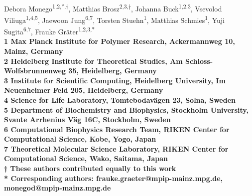 \documentclass[10pt,letterpaper]{article}
\begin{document}
\vspace*{0.35in}

\begin{flushleft}
{\Large
\textbf{}
}
\newline
\\
Debora Monego\textsuperscript{1,2,*,†},
Matthias Brosz\textsuperscript{2,3,†},
Johanna Buck\textsuperscript{1,2,3},
Vsevolod Viliuga\textsuperscript{1,4,5},
Jaewoon Jung\textsuperscript{6,7},
Torsten Stuehn\textsuperscript{1},
Matthias Schmies\textsuperscript{1},
Yuji Sugita\textsuperscript{6,7},
Frauke Gr\"ater\textsuperscript{1,2,3,*}
\\
\bigskip
\bf{1} Max Planck Institute for Polymer Research, Ackermannweg 10, Mainz, Germany
\\
\bf{2} Heidelberg Institute for Theoretical Studies, Am Schloss-Wolfsbrunnenweg 35, Heidelberg, Germany
\\
\bf{3} Institute for Scientific Computing, Heidelberg University, Im Neuenheimer Feld 205, Heidelberg, Germany
\\
\bf{4} Science for Life Laboratory, Tomtebodavägen 23, Solna, Sweden
\\
\bf{5} Department of Biochemistry and Biophysics, Stockholm University, Svante Arrhenius Väg 16C, Stockholm, Sweden
\\
\bf{6} Computational Biophysics Research Team, RIKEN Center for Computational Science, Kobe, Yogo, Japan
\\
\bf{7} Theoretical Molecular Science Laboratory, RIKEN Center for Computational Science, Wako, Saitama, Japan
\\
\bigskip
† These authors contributed equally to this work
\\
* Corresponding authors: frauke.graeter@mpip-mainz.mpg.de, monegod@mpip-mainz.mpg.de

\end{flushleft}


\justifying
\end{document}
